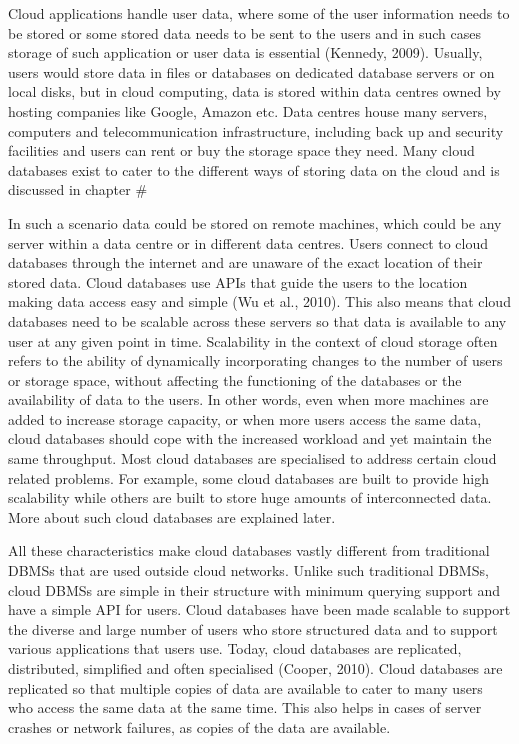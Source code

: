 Cloud applications handle user data, where some of the user information needs to
be stored or  some stored data needs to be sent to the users and in such cases
storage of such application or user data is essential (Kennedy, 2009). Usually,
users would store data in files or databases on dedicated database servers or on
local disks, but in cloud computing, data is stored within data centres owned by
hosting companies like Google, Amazon etc. Data centres house many servers,
computers and telecommunication infrastructure, including back up and security
facilities and users can rent or buy the storage space they need. Many cloud
databases exist to cater to the different ways of storing data on the cloud and
is discussed in chapter \#

In such a scenario data could be stored on remote machines, which could be any
server within a data centre or in different data centres. Users connect to cloud
databases through the internet and are unaware of the exact location of their
stored data. Cloud databases use \acp{API} that guide the users to the location
making data access easy and simple (Wu et al., 2010). This also means that cloud
databases need to be scalable across these servers so that data is available to
any user at any given point in time. Scalability in the context of cloud storage
often refers to the ability of dynamically incorporating changes to the number
of users or storage space, without affecting the functioning of the databases or
the availability of data to the users. In other words, even when more machines
are added to increase storage capacity, or when more users access the same data,
cloud databases should cope with the increased workload and yet maintain the
same throughput. Most cloud databases are specialised to address certain cloud
related problems. For example, some cloud databases are built to provide high
scalability while others are built to store huge amounts of interconnected data.
More about such cloud databases are explained later.

All these characteristics make cloud databases vastly different from traditional
\acp{DBMS} that are used outside cloud networks. Unlike such traditional \acp{DBMS}, cloud
\acp{DBMS} are simple in their structure with minimum querying support and have a
simple API for users. Cloud databases have been made scalable to support the
diverse and large number of users who store structured data and to support
various applications that users use. Today, cloud databases are replicated,
distributed, simplified and often specialised (Cooper, 2010). Cloud databases
are replicated so that multiple copies of data are available to cater to many
users who access the same data at the same time. This also helps in cases of
server crashes or network failures, as copies of the data are available.

